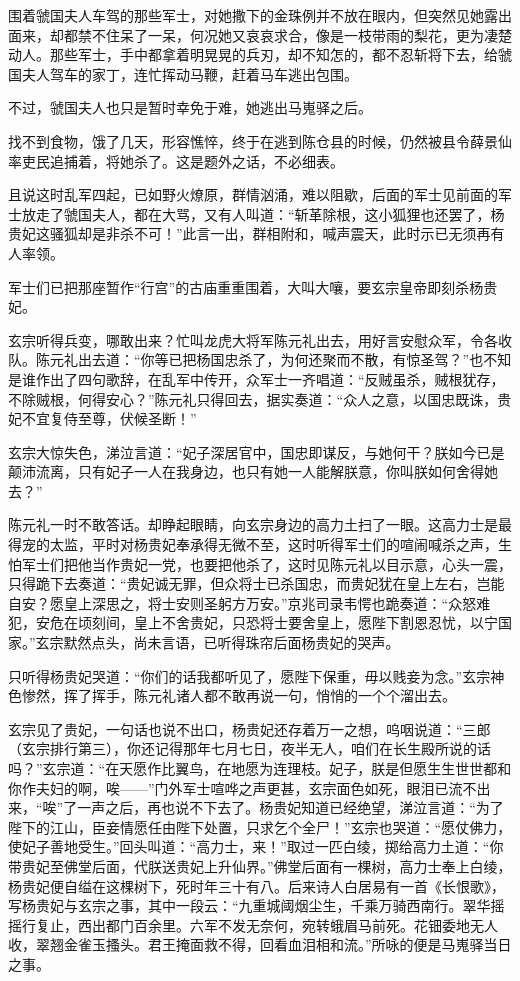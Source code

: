 \documentclass[12pt,oneside]{book}
\begin{document}
围着虢国夫人车驾的那些军士，对她撒下的金珠例并不放在眼内，但突然见她露出面来，却都禁不住呆了一呆，何况她又哀哀求合，像是一枝带雨的梨花，更为凄楚动人。那些军士，手中都拿着明晃晃的兵刃，却不知怎的，都不忍斩将下去，给虢国夫人驾车的家丁，连忙挥动马鞭，赶着马车逃出包围。

不过，虢国夫人也只是暂时幸免于难，她逃出马嵬驿之后。

找不到食物，饿了几天，形容憔悴，终于在逃到陈仓县的时候，仍然被县令薛景仙率吏民追捕着，将她杀了。这是题外之话，不必细表。

且说这时乱军四起，已如野火燎原，群情汹涌，难以阻歇，后面的军士见前面的军士放走了虢国夫人，都在大骂，又有人叫道：``斩革除根，这小狐狸也还罢了，杨贵妃这骚狐却是非杀不可！''此言一出，群相附和，喊声震天，此时示已无须再有人率领。

军士们已把那座暂作``行宫''的古庙重重围着，大叫大嚷，要玄宗皇帝即刻杀杨贵妃。

玄宗听得兵变，哪敢出来？忙叫龙虎大将军陈元礼出去，用好言安慰众军，令各收队。陈元礼出去道：``你等已把杨国忠杀了，为何还聚而不散，有惊圣驾？''也不知是谁作出了四句歌辞，在乱军中传开，众军士一齐唱道：``反贼虽杀，贼根犹存，不除贼根，何得安心？''陈元礼只得回去，据实奏道：``众人之意，以国忠既诛，贵妃不宜复侍至尊，伏候圣断！''

玄宗大惊失色，涕泣言道：``妃子深居官中，国忠即谋反，与她何干？朕如今已是颠沛流离，只有妃子一人在我身边，也只有她一人能解朕意，你叫朕如何舍得她去？''

陈元礼一时不敢答话。却睁起眼睛，向玄宗身边的高力土扫了一眼。这高力士是最得宠的太监，平时对杨贵妃奉承得无微不至，这时听得军士们的喧闹喊杀之声，生怕军士们把他当作贵妃一党，也要把他杀了，这时见陈元礼以目示意，心头一震，只得跪下去奏道：``贵妃诚无罪，但众将士已杀国忠，而贵妃犹在皇上左右，岂能自安？愿皇上深思之，将士安则圣躬方万安。''京兆司录韦愕也跪奏道：``众怒难犯，安危在顷刻间，皇上不舍贵妃，只恐将士要舍皇上，愿陛下割恩忍忧，以宁国家。''玄宗默然点头，尚未言语，已听得珠帘后面杨贵妃的哭声。

只听得杨贵妃哭道：``你们的话我都听见了，愿陛下保重，毋以贱妾为念。''玄宗神色惨然，挥了挥手，陈元礼诸人都不敢再说一句，悄悄的一个个溜出去。

玄宗见了贵妃，一句话也说不出口，杨贵妃还存着万一之想，呜咽说道：``三郎（玄宗排行第三），你还记得那年七月七日，夜半无人，咱们在长生殿所说的话吗？''玄宗道：``在天愿作比翼鸟，在地愿为连理枝。妃子，朕是但愿生生世世都和你作夫妇的啊，唉------''门外军士喧哗之声更甚，玄宗面色如死，眼泪已流不出来，``唉''了一声之后，再也说不下去了。杨贵妃知道已经绝望，涕泣言道：``为了陛下的江山，臣妾情愿任由陛下处置，只求乞个全尸！''玄宗也哭道：``愿仗佛力，使妃子善地受生。''回头叫道：``高力士，来！''取过一匹白绫，掷给高力土道：``你带贵妃至佛堂后面，代朕送贵妃上升仙界。''佛堂后面有一棵树，高力士奉上白绫，杨贵妃便自缢在这棵树下，死时年三十有八。后来诗人白居易有一首《长恨歌》，写杨贵妃与玄宗之事，其中一段云：``九重城阈烟尘生，千乘万骑西南行。翠华摇摇行复止，西出都门百余里。六军不发无奈何，宛转蛾眉马前死。花钿委地无人收，翠翘金雀玉搔头。君王掩面救不得，回看血泪相和流。''所咏的便是马嵬驿当日之事。
\end{document}
